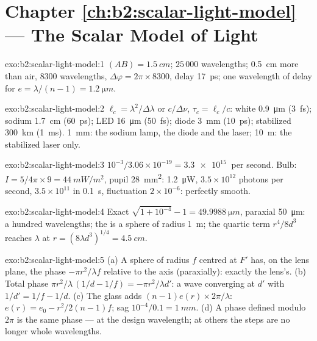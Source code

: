 \section*{Chapter \ref{ch:b2:scalar-light-model} --- The Scalar Model of Light}

\begin{solution}{exo:b2:scalar-light-model:1}
$(AB) = \qty{1.5}{cm}$; $25\,000$ wavelengths; \qty{0.5}{cm} more than air, $8300$
wavelengths, $\Delta\varphi = 2\pi \times 8300$, delay \qty{17}{ps}; one wavelength of
delay for $e = \lambda/(n - 1) = \qty{1.2}{\micro m}$.
\end{solution}

\begin{solution}{exo:b2:scalar-light-model:2}
$\ell_c = \lambda^2/\Delta\lambda$ or $c/\Delta\nu$, $\tau_c = \ell_c/c$: white \qty{0.9}{\micro m} (\qty{3}{fs});
sodium \qty{1.7}{cm} (\qty{60}{ps}); LED \qty{16}{\micro m} (\qty{50}{fs}); diode \qty{3}{mm}
(\qty{10}{ps}); stabilized \qty{300}{km} (\qty{1}{ms}). \qty{1}{mm}: the sodium lamp,
the diode and the laser; \qty{10}{m}: the stabilized laser only.
\end{solution}

\begin{solution}{exo:b2:scalar-light-model:3}
$10^{-3}/3.06 \times 10^{-19} = \qty{3.3e15}{}$ per second. Bulb: $I = 5/4\pi \times 9 =
\qty{44}{mW/m^2}$, pupil \qty{28}{mm^2}: \qty{1.2}{\micro W}, $3.5 \times 10^{12}$ photons per second,
$3.5 \times 10^{11}$ in \qty{0.1}{s}, fluctuation $2 \times 10^{-6}$: perfectly smooth.
\end{solution}

\begin{solution}{exo:b2:scalar-light-model:4}
Exact $\sqrt{1 + 10^{-4}} - 1 = \qty{49.9988}{\micro m}$, paraxial \qty{50}{\micro m}: a
hundred wavelengths; the  is a sphere of radius \qty{1}{m}; the
quartic term $r^4/8d^3$ reaches $\lambda$ at $r = (8\lambda d^3)^{1/4} = \qty{4.5}{cm}$.
\end{solution}

\begin{solution}{exo:b2:scalar-light-model:5}
(a) A sphere of radius $f$ centred at $F'$ has, on the lens plane, the
phase $-\pi r^2/\lambda f$ relative to the axis (paraxially): exactly the
lens's. (b) Total phase $\pi r^2/\lambda\,(1/d - 1/f) = -\pi r^2/\lambda d'$: a wave
converging at $d'$ with $1/d' = 1/f - 1/d$. (c) The glass adds $(n - 1)e(r)
\times2\pi/\lambda$: $e(r) = e_0 - r^2/2(n - 1)f$; sag $10^{-4}/0.1 = \qty{1}{mm}$. (d) A
phase defined modulo $2\pi$ is the same phase --- at the design
wavelength; at others the steps are no longer whole wavelengths.
\end{solution}

